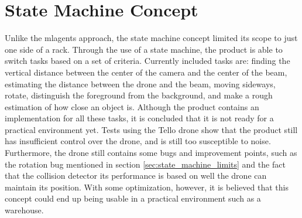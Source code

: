 \section{State Machine Concept}
Unlike the \gls{mlagents} approach, the state machine concept limited its scope to just one side of a rack. Through the use of a state machine, the product is able to switch tasks based on a set of criteria. Currently included tasks are: finding the vertical distance between the center of the camera and the center of the beam, estimating the distance between the drone and the beam, moving sideways, rotate, distinguish the foreground from the background, and make a rough estimation of how close an object is. Although the product contains an implementation for all these tasks, it is concluded that it is not ready for a practical environment yet. Tests using the Tello drone show that the product still has insufficient control over the drone, and is still too susceptible to noise. Furthermore, the drone still contains some bugs and improvement points, such as the rotation bug mentioned in section \ref{sec:state_machine_limits} and the fact that the collision detector its performance is based on well the drone can maintain its position. With some optimization, however,  it is believed that this concept could end up being usable in a practical environment such as a warehouse.

